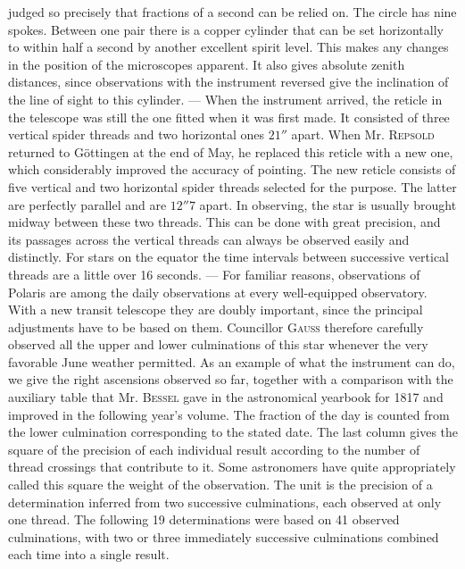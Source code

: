 judged so precisely that fractions of a second can be relied on. The circle has nine spokes. Between one pair there is a copper cylinder that can be set horizontally to within half a second by another excellent spirit level. This makes any changes in the position of the microscopes apparent. It also gives absolute zenith distances, since observations with the instrument reversed give the inclination of the line of sight to this cylinder. --- When the instrument arrived, the reticle in the telescope was still the one fitted when it was first made. It consisted of three vertical spider threads and two horizontal ones $21''$ apart. When Mr. \textsc{Repsold} returned to Göttingen at the end of May, he replaced this reticle with a new one, which considerably improved the accuracy of pointing. The new reticle consists of five vertical and two horizontal spider threads selected for the purpose. The latter are perfectly parallel and are $12''7$ apart. In observing, the star is usually brought midway between these two threads. This can be done with great precision, and its passages across the vertical threads can always be observed easily and distinctly. For stars on the equator the time intervals between successive vertical threads are a little over 16 seconds. --- For familiar reasons, observations of Polaris are among the daily observations at every well-equipped  observatory. With a new transit telescope they are doubly important, since the principal adjustments have to be based on them. Councillor \textsc{Gauss} therefore carefully observed all the upper and lower culminations of this star whenever the very favorable June weather permitted. As an example of what the instrument can do, we give the right ascensions observed so far, together with a comparison with the auxiliary table that Mr. \textsc{Bessel} gave in the astronomical yearbook for 1817 and improved in the following year’s volume. The fraction of the day is counted from the lower culmination corresponding to the stated date. The last column gives the square of the precision of each individual result according to the number of thread crossings that contribute to it. Some astronomers have quite appropriately called this square the weight of the observation. The unit is the precision of a determination inferred from two successive culminations, each observed at only one thread. The following 19 determinations were based on 41 observed culminations, with two or three immediately successive culminations combined each time into a single result.


